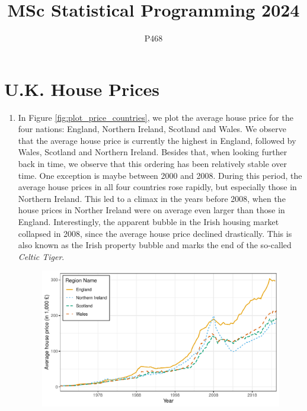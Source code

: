 \documentclass[a4paper,11pt]{article}\usepackage[]{graphicx}\usepackage[]{xcolor}
\author{P468}
\title{MSc Statistical Programming 2024}
\newenvironment{knitrout}{}{} %
\begin{document}
\maketitle



\section{U.K. House Prices}

\begin{enumerate}






\item In Figure \ref{fig:plot_price_countries}, we plot the average house price for the four nations: England, Northern Ireland, Scotland and Wales. We observe that the average house price is currently the highest in England, followed by Wales, Scotland and Northern Ireland. Besides that, when looking further back in time, we observe that this ordering has been relatively stable over time. One exception is maybe between 2000 and 2008. During this period, the average house prices in all four countries rose rapidly, but especially those in Northern Ireland. This led to a climax in the years before 2008, when the house prices in Norther Ireland were on average even larger than those in England. Interestingly, the apparent bubble in the Irish housing market collapsed in 2008, since the average house price declined drastically. This is also known as the Irish property bubble and marks the end of the so-called \textit{Celtic Tiger}.

\begin{knitrout}
\color{fgcolor}\begin{figure}[H]

{\centering \includegraphics[width=0.8\linewidth]{figure/plot_price_countries-1} 

}
\end{figure}
\end{knitrout}
\end{enumerate}
\end{document}
